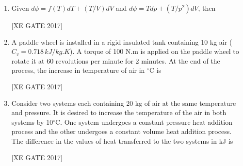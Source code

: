 \documentclass[journal,12pt,onecolumn]{IEEEtran}
\theoremstyle{remark}
\begin{document}
\begin{enumerate}
\item Given $d\phi = f(T)dT + (T/V)dV$ and $d\psi = Tdp + (T/p^{2})dV$, then  

\hfill [XE GATE 2017]

\begin{enumerate}
\end{enumerate}


\item A paddle wheel is installed in a rigid insulated tank containing 10 kg air ($C_v = 0.718 \, kJ/kg.K$). A torque of 100 N.m is applied on the paddle wheel to rotate it at 60 revolutions per minute for 2 minutes. At the end of the process, the increase in temperature of air in $^\circ$C is  

\hfill [XE GATE 2017]

\begin{enumerate}
\end{enumerate}


\item Consider two systems each containing 20 kg of air at the same temperature and pressure. It is desired to increase the temperature of the air in both systems by 10$^\circ$C. One system undergoes a constant pressure heat addition process and the other undergoes a constant volume heat addition process. The difference in the values of heat transferred to the two systems in kJ is  

\hfill [XE GATE 2017]

\begin{enumerate}
\end{enumerate}



\end{enumerate}
\end{document}
